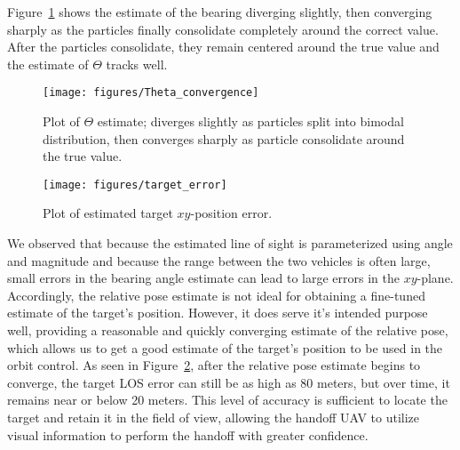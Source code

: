 Figure~\ref{fig:theta_convergence} shows the estimate of the bearing diverging slightly, then converging sharply as the particles finally consolidate completely around the correct value.
After the particles consolidate, they remain centered around the true value and the estimate of $\Theta$ tracks well.

\begin{figure}[hbt]
  \texttt{[image: figures/Theta\_convergence]}
  \caption{Plot of $\Theta$ estimate; diverges slightly as particles split into bimodal distribution, then converges sharply as particle consolidate around the true value.}
  \label{fig:theta_convergence}
\end{figure}

\begin{figure}[hbt]
  \texttt{[image: figures/target\_error]}
  \caption{Plot of estimated target $xy$-position error.}
  \label{fig:target_los_error}
\end{figure}

We observed that because the estimated line of sight is parameterized using angle and magnitude and because the range between the two vehicles is often large, small errors in the bearing angle estimate can lead to large errors in the $xy$-plane.
Accordingly, the relative pose estimate is not ideal for obtaining a fine-tuned estimate of the target's position.
However, it does serve it's intended purpose well, providing a reasonable and quickly converging estimate of the relative pose, which allows us to get a good estimate of the target's position to be used in the orbit control.
As seen in Figure~\ref{fig:target_los_error}, after the relative pose estimate begins to converge, the target LOS error can still be as high as 80 meters, but over time, it remains near or below 20 meters.
This level of accuracy is sufficient to locate the target and retain it in the field of view, allowing the handoff UAV to utilize visual information to perform the handoff with greater confidence.

